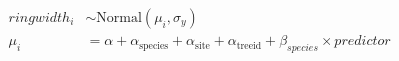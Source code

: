 \documentclass{standalone}
\begin{document}
$
\begin{aligned}
ringwidth_i &\sim \text{Normal}(\mu_i, \sigma_y) \\
\mu_i &= \alpha + \alpha_{\text{species}} + \alpha_{\text{site}} + \alpha_{\text{treeid}} + \beta_{species} \times predictor \\
\end{aligned}
$
\end{document}
